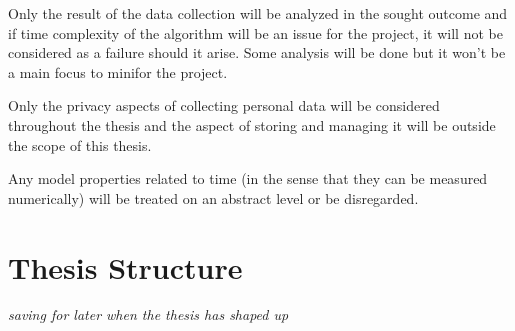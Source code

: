 Only the result of the data collection will be analyzed in the sought outcome and if time complexity of the algorithm will be an issue for the project, it will not be considered as a failure should it arise. Some analysis will be done but it won't be a main focus to minifor the project.

Only the privacy aspects of collecting personal data will be considered throughout the thesis and the aspect of storing and managing it will be outside the scope of this thesis.

Any model properties related to time (in the sense that they can be measured numerically) will be treated on an abstract level or be disregarded. %





\section{Thesis Structure}

\textit{saving for later when the thesis has shaped up}

